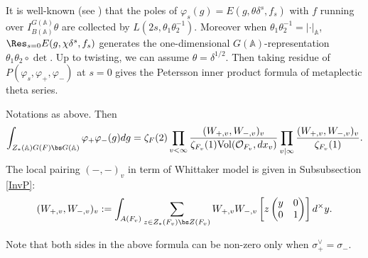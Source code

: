 \documentclass[11pt,reqno]{amsart}
\newcommand{\BA}{{\mathbb {A}}} \newcommand{\BB}{{\mathbb {B}}}
\newcommand{\CO}{{\mathcal {O}}} \newcommand{\CP}{{\mathcal {P}}}
\newcommand{\Vol}{{\mathrm{Vol}}}\newcommand{\vol}{{\mathrm{vol}}}
\theoremstyle{plain}
\theoremstyle{remark} \newtheorem{remark}[thm]{Remark}
\theoremstyle{definition} \newtheorem{exercise}[thm]{Exercise}
\theoremstyle{definition} \newtheorem{example}[thm]{Example} \newtheorem{condition}[thm]{Condition}
\numberwithin{equation}{section}
\renewcommand{\-}{\text{--}}
\begin{document}
It is well-known (see \cite[Theorem 3.7.1]{Bum97}) that  the poles of $\varphi_s(g)=E(g,\theta\delta^s, f_s)$ with $f$ running over $I_{B(\BA)}^{G(\BA)}\theta$ are collected by $L(2s,\theta_1\theta_2^{-1})$. Moreover when $\theta_1\theta_2^{-1}=|\cdot|_\BA$, $\Res_{s=0}E(g,\chi\delta^s, f_s)$ generates the one-dimensional $G(\BA)$-representation $\theta_1\theta_2\circ\det$. Up to twisting, we can assume $\theta=\delta^{1/2}$. Then taking residue of $P(\varphi_s,\varphi_+,\varphi_-)$ at $s=0$ gives the Petersson inner product formula of metaplectic theta series. 
\begin{cor}\label{Petersson}Notations as above.  Then
\[\int_{Z_*(\BA)G(F)\bs G(\BA)}\varphi_+\varphi_-(g)dg=\zeta_F(2) 
\prod_{v<\infty}\frac{(W_{+,v}, W_{-,v})_v}{\zeta_{F_v}(1)\Vol(\CO_{F_v},dx_v)}\prod_{v\mid \infty}\frac{(W_{+,v}, W_{-,v})_v}{\zeta_{F_v}(1)}.\]
The local pairing $(-,-)_v$ in term of Whittaker model is given in Subsubsection \ref{InvP}:
\[(W_{+,v}, W_{-,v})_v:=\int_{A(F_v)}\sum_{z\in Z_*(F_v)\bs Z(F_v)}W_{+,v}W_{-,v}\left[z\begin{pmatrix}y & 0\\ 0 & 1\end{pmatrix}\right]d^\times y.\]
\end{cor}
Note that both sides in the above formula can  be non-zero only when $\sigma_+^\vee=\sigma_-$. 
\end{document}
